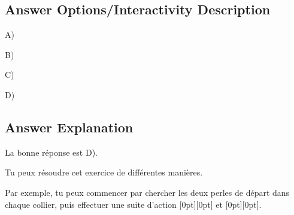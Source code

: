 \documentclass[a4paper,11pt]{report}
\newcommand{\taskGraphicsFolder}{..}
\begin{document}
\begingroup
\renewcommand{\arraystretch}{1.5}
\subsection*{Answer Options/Interactivity Description}

A) \raisebox{-0.5ex}{}

B) \raisebox{-0.5ex}{}

C) \raisebox{-0.5ex}{}

D) \raisebox{-0.5ex}{}

\endgroup

\subsection*{Answer Explanation}

La bonne réponse est D).

{\centering%
\par}

Tu peux résoudre cet exercice de différentes manières.

Par exemple, tu peux commencer par chercher les deux perles de départ dans chaque collier, puis effectuer une suite d’action \raisebox{-0.5ex}[0pt][0pt]{} et \raisebox{-0.5ex}[0pt][0pt]{}.
\end{document}
